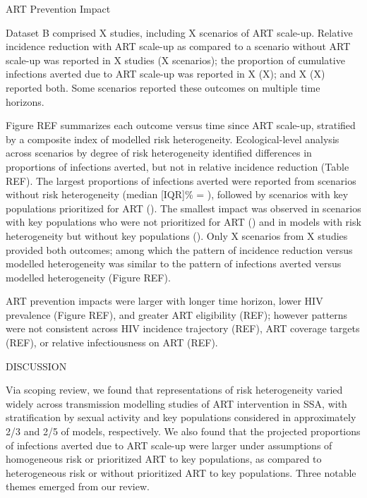 ART Prevention Impact

Dataset B comprised X studies,
including X scenarios of ART scale-up.
Relative incidence reduction with ART scale-up
as compared to a scenario without ART scale-up
was reported in X studies (X scenarios);
the proportion of cumulative infections averted due to ART scale-up
was reported in X (X);
and X (X) reported both.
Some scenarios reported these outcomes on multiple time horizons.

Figure REF summarizes each outcome versus time since ART scale-up,
stratified by a composite index of modelled risk heterogeneity.
Ecological-level analysis across scenarios by degree of risk heterogeneity
identified differences in proportions of infections averted,
but not in relative incidence reduction (Table REF).
The largest proportions of infections averted were reported from 
scenarios without risk heterogeneity (median [IQR]\% = ), followed by
scenarios with key populations prioritized for ART ().
The smallest impact was observed in scenarios with
key populations who were not prioritized for ART ()
and in models with risk heterogeneity but without key populations
().
Only X scenarios from X studies provided both outcomes; 
among which the pattern of incidence reduction versus modelled heterogeneity
was similar to the pattern of infections averted versus modelled heterogeneity
(Figure REF).

ART prevention impacts were larger with
longer time horizon,
lower HIV prevalence (Figure REF), and
greater ART eligibility (REF);
however patterns were not consistent across
HIV incidence trajectory (REF),
ART coverage targets (REF), or
relative infectiousness on ART (REF).

DISCUSSION

Via scoping review, we found that representations of risk heterogeneity varied widely across
transmission modelling studies of ART intervention in SSA, with
stratification by sexual activity and key populations considered in approximately
2/3 and 2/5 of models, respectively.
We also found that the projected proportions of infections averted due to ART scale-up were
larger under assumptions of homogeneous risk or prioritized ART to key populations,
as compared to heterogeneous risk or without prioritized ART to key populations.
Three notable themes emerged from our review.

